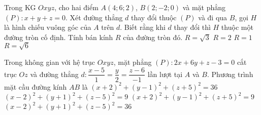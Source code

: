 \begin{ex}%
	Trong KG $Oxyz$, cho hai điểm $A(4;6;2)$, $B(2;-2;0)$ và mặt phẳng $(P)\colon x+y+z=0$. Xét đường thẳng $d$ thay đổi thuộc $(P)$ và đi qua $B$, gọi $H$ là hình chiếu vuông góc của $A$ trên $d$. Biết rằng khi $d$ thay đổi thì $H$ thuộc một đường tròn cố định. Tính bán kính $R$ của đường tròn đó.
	\choice 
		{$R=\sqrt{3}$}
		{$R=2$}
		{$R=1$}
		{\True $R=\sqrt{6}$}
\end{ex}

\begin{ex}%
	Trong không gian với hệ trục $Oxyz$, mặt phẳng $(P)\colon 2x+6y+z-3=0$ cắt trục $Oz$ và đường thẳng $d\colon \dfrac{x-5}{1}=\dfrac{y}{2}=\dfrac{z-6}{-1}$ lần lượt tại $A$ và $B$. Phương trình mặt cầu đường kính $AB$ là
	\choice 						
		{$(x+2)^2+(y-1)^2+(z+5)^2=36$}
		{\True $(x-2)^2+(y+1)^2+(z-5)^2=9$}
		{$(x+2)^2+(y-1)^2+(z+5)^2=9$}
		{$(x-2)^2+(y+1)^2+(z-5)^2=36$}
\end{ex}

